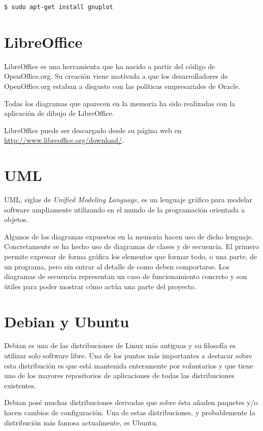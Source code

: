 \begin{verbatim}
$ sudo apt-get install gnuplot
\end{verbatim}

\section{LibreOffice}

LibreOffice es una herramienta que ha nacido a partir del código de OpenOffice.org. Su creación viene motivada a que los desarrolladores de OpenOffice.org estaban a disgusto con las políticas empresariales de Oracle.

Todas los diagramas que aparecen en la memoria ha sido realizadas con la aplicación de dibujo de LibreOffice.

LibreOffice puede ser descargado desde su página web en \url{http://www.libreoffice.org/download/}.

\section{UML}

UML, siglas de \emph{Unified Modeling Language}, es un lenguaje gráfico para modelar software ampliamente utilizando en el mundo de la programación orientada a objetos.

Algunos de los diagramas expuestos en la memoria hacen uso de dicho lenguaje. Concretamente se ha hecho uso de diagramas de clases y de secuencia. El primero permite expresar de forma gráfica los elementos que formar todo, o una parte, de un programa, pero sin entrar al detalle de como deben comportarse. Los diagramas de secuencia representan un caso de funcionamiento concreto y son útiles para poder mostrar cómo actúa una parte del proyecto.

\section{Debian y Ubuntu}

Debian es una de las distribuciones de Linux más antiguas y su filosofía es utilizar solo software libre. Una de los puntos más importantes a destacar sobre esta distribución es que está mantenida enteramente por voluntarios y que tiene uno de los mayores repositorios de aplicaciones de todas las distribuciones existentes.

Debian posé muchas distribuciones derivadas que sobre ésta añaden paquetes y/o hacen cambios de configuración. Una de estas distribuciones, y probablemente la distribución más famosa actualmente, es Ubuntu.

